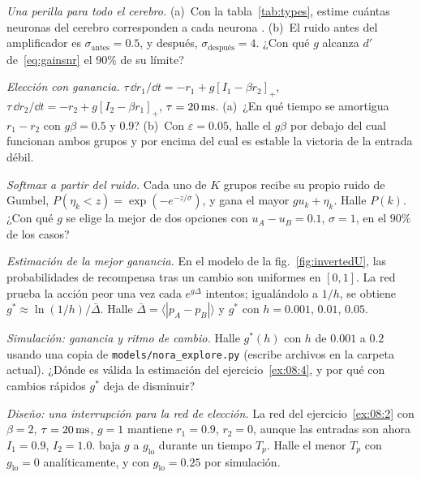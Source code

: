 \begin{exercise}[\lvlA]
\label{ex:08:1}
\emph{Una perilla para todo el cerebro.} (a)~Con la tabla~\ref{tab:types}, estime cuántas neuronas del cerebro corresponden a cada neurona . (b)~El ruido antes del amplificador es $\sigma_{\text{antes}}=0.5$, y después, $\sigma_{\text{después}}=4$. ¿Con qué $g$ alcanza $d'$ de~\eqref{eq:gainsnr} el $90\%$ de su límite?
\end{exercise}

\begin{exercise}[\lvlB]
\label{ex:08:2}
\emph{Elección con ganancia.} $\tau\,\dd r_1/\dd t=-r_1+g[I_1-\beta r_2]_+$, $\tau\,\dd r_2/\dd t=-r_2+g[I_2-\beta r_1]_+$, $\tau=20\,\text{ms}$. (a)~¿En qué tiempo se amortigua $r_1-r_2$ con $g\beta=0.5$ y $0.9$? (b)~Con $\varepsilon=0.05$, halle el $g\beta$ por debajo del cual funcionan ambos grupos y por encima del cual es estable la victoria de la entrada débil.
\end{exercise}

\begin{exercise}[\lvlA]
\label{ex:08:3}
\emph{Softmax a partir del ruido.} Cada uno de $K$ grupos recibe su propio ruido de Gumbel, $P(\eta_k<z)=\exp(-e^{-z/\sigma})$, y gana el mayor $gu_k+\eta_k$. Halle $P(k)$. ¿Con qué $g$ se elige la mejor de dos opciones con $u_A-u_B=0.1$, $\sigma=1$, en el $90\%$ de los casos?
\end{exercise}

\begin{exercise}[\lvlB]
\label{ex:08:4}
\emph{Estimación de la mejor ganancia.} En el modelo de la fig.~\ref{fig:invertedU}, las probabilidades de recompensa tras un cambio son uniformes en $[0,1]$. La red prueba la acción peor una vez cada $e^{g\Delta}$ intentos; igualándolo a $1/h$, se obtiene $g^*\approx\ln(1/h)/\bar\Delta$. Halle $\bar\Delta=\langle|p_A-p_B|\rangle$ y $g^*$ con $h=0.001$, $0.01$, $0.05$.
\end{exercise}

\begin{exercise}[\lvlB]
\label{ex:08:5}
\emph{Simulación: ganancia y ritmo de cambio.} Halle $g^*(h)$ con $h$ de $0.001$ a $0.2$ usando una copia de \texttt{models/\allowbreak nora\_explore.py} (escribe archivos en la carpeta actual). ¿Dónde es válida la estimación del ejercicio~\ref{ex:08:4}, y por qué con cambios rápidos $g^*$ deja de disminuir?
\end{exercise}

\begin{exercise}[\lvlB]
\label{ex:08:6}
\emph{Diseño: una interrupción para la red de elección.} La red del ejercicio~\ref{ex:08:2} con $\beta=2$, $\tau=20\,\text{ms}$, $g=1$ mantiene $r_1=0.9$, $r_2=0$, aunque las entradas son ahora $I_1=0.9$, $I_2=1.0$.  baja $g$ a $g_{\text{lo}}$ durante un tiempo $T_p$. Halle el menor $T_p$ con $g_{\text{lo}}=0$ analíticamente, y con $g_{\text{lo}}=0.25$ por simulación.
\end{exercise}

